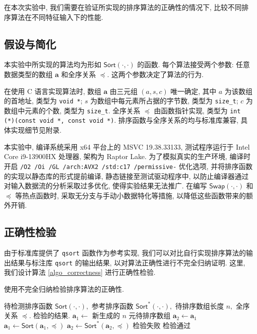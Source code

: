 \documentclass[12pt]{article}
\begin{document}
在本次实验中, 我们需要在验证所实现的排序算法的正确性的情况下, 比较不同排序算法在不同特征输入下的性能.

\subsection{假设与简化}

本实验中所实现的算法均为形如 $\mathsf{Sort}(\cdot, \cdot)$ 的函数. 每个算法接受两个参数: 任意数据类型的数组 $\bm{a}$ 和全序关系 $\preceq.$ 这两个参数决定了算法的行为.

在使用 C 语言实现算法时, 数组 $\bm{a}$ 由三元组 $(a, s, c)$ 唯一确定, 其中 $a$ 为该数组的首地址, 类型为 \texttt{void *}; $s$ 为数组中每元素所占据的字节数, 类型为 \texttt{size\_t}; $c$ 为数组中元素的个数, 类型为 \texttt{size\_t}. 全序关系 $\preceq$ 由函数指针实现, 类型为 \texttt{int (*)(const void *, const void *)}. 排序函数与全序关系的均与标准库兼容, 具体实现细节见附录.

本实验中, 编译系统采用 x64 平台上的 MSVC 19.38.33133, 测试程序运行于 Intel Core i9-13900HX 处理器, 架构为 Raptor Lake. 为了模拟真实的生产环境, 编译时开启 \texttt{/O2 /Oi /GL /arch:AVX2 /std:c17 /permissive-} 优化选项, 并将排序函数的实现以静态库的形式提前编译, 静态链接至测试驱动程序中, 以防止编译器通过对输入数据流的分析采取过多优化, 使得实验结果无法推广. 在编写 $\mathsf{Swap}(\cdot, \cdot)$ 和 $\preceq$ 等热点函数时, 采取无分支与手动小数据特化等措施, 以降低这些函数带来的额外开销.

\subsection{正确性检验}

由于标准库提供了 \texttt{qsort} 函数作为参考实现, 我们可以对比自行实现排序算法的输出结果与标注库 \texttt{qsort} 的输出结果, 以对算法正确性进行不完全归纳证明. 这里, 我们设计算法 \ref{algo_correctness} 进行正确性检验.

\begin{algorithm}[H]
\caption{使用不完全归纳检验排序算法的正确性.}
\label{algo_correctness}
\begin{algorithmic}[1]
\Require 待检测排序函数 $\mathsf{Sort}(\cdot, \cdot),$ 参考排序函数 $\mathsf{Sort}^*(\cdot, \cdot),$ 待排序数组长度 $n,$ 全序关系 $\preceq.$
\Ensure 检验的结果.
\State $\bm{a}_1 \gets$ 新生成的 $n$ 元待排序数组
\State $\bm{a}_2 \gets \bm{a}_1$
\State $\bm{a}_1 \gets \mathsf{Sort}(\bm{a}_1, \preceq)$
\State $\bm{a}_2 \gets \mathsf{Sort}^*(\bm{a}_2, \preceq)$
       \State \Return 检验失败
    \EndIf
\EndFor
\State \Return 检验通过
\end{algorithmic}
\end{algorithm}
\end{document}
